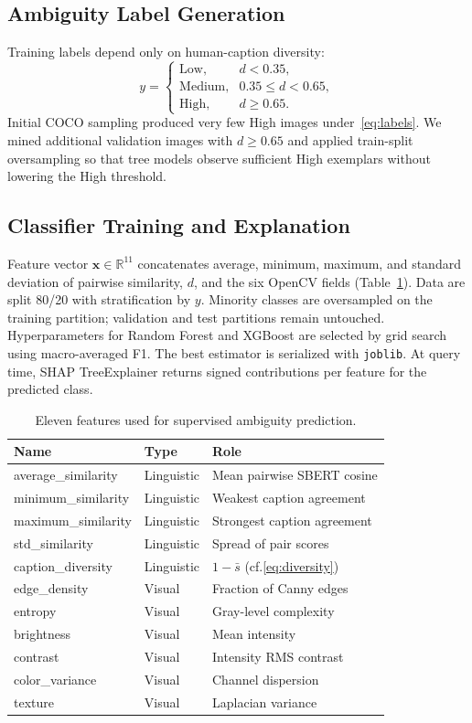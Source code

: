 \documentclass[conference]{IEEEtran}
\begin{document}
\subsection{Ambiguity Label Generation}
\label{sec:labels}
Training labels depend only on human-caption diversity:
\begin{equation}
y =
\begin{cases}
\text{Low}, & d < 0.35,\\
\text{Medium}, & 0.35 \le d < 0.65,\\
\text{High}, & d \ge 0.65.
\end{cases}
\label{eq:labels}
\end{equation}
Initial COCO sampling produced very few High images under~\eqref{eq:labels}. We mined additional validation images with $d\!\ge\!0.65$ and applied train-split oversampling so that tree models observe sufficient High exemplars without lowering the High threshold.

\subsection{Classifier Training and Explanation}
\label{sec:train}
Feature vector $\mathbf{x}\!\in\!\mathbb{R}^{11}$ concatenates average, minimum, maximum, and standard deviation of pairwise similarity, $d$, and the six OpenCV fields (Table~\ref{tab:features}). Data are split 80/20 with stratification by $y$. Minority classes are oversampled on the training partition; validation and test partitions remain untouched. Hyperparameters for Random Forest and XGBoost are selected by grid search using macro-averaged F1. The best estimator is serialized with \texttt{joblib}. At query time, SHAP TreeExplainer returns signed contributions per feature for the predicted class.

\begin{table}[t]
\centering
\caption{Eleven features used for supervised ambiguity prediction.}
\label{tab:features}
\small
\begin{tabular}{llp{3.2cm}}
\toprule
Name & Type & Role \\
\midrule
average\_similarity & Linguistic & Mean pairwise SBERT cosine \\
minimum\_similarity & Linguistic & Weakest caption agreement \\
maximum\_similarity & Linguistic & Strongest caption agreement \\
std\_similarity & Linguistic & Spread of pair scores \\
caption\_diversity & Linguistic & $1-\bar{s}$ (cf.\~\eqref{eq:diversity}) \\
edge\_density & Visual & Fraction of Canny edges \\
entropy & Visual & Gray-level complexity \\
brightness & Visual & Mean intensity \\
contrast & Visual & Intensity RMS contrast \\
color\_variance & Visual & Channel dispersion \\
texture & Visual & Laplacian variance \\
\bottomrule
\end{tabular}
\end{table}
\end{document}
